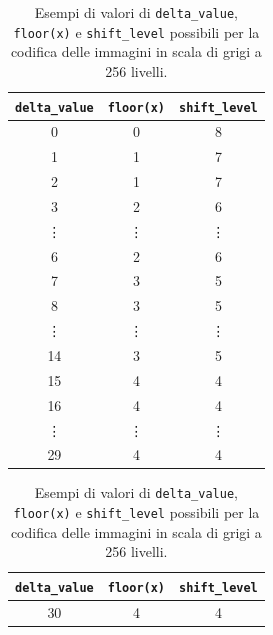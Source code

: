 \documentclass{article}
\begin{document}
\begin{itemize}
            \vspace{0,2cm}
            \begin{table}[h]
                \centering
                \small
                \def\arraystretch{1.3} %
                \caption{Esempi di valori di \texttt{delta\_value}, \texttt{floor(x)} e \texttt{shift\_level} possibili per la codifica delle immagini in scala di grigi a 256 livelli.}
                \begin{tabular}{||c|c|c||}
                    \hline
                    \texttt{delta\_value} & \texttt{floor(x)\footnotemark} & \texttt{shift\_level}\\
                    \hline \hline
                    0       & 0         & 8         \\\hline
                    1       & 1         & 7         \\\hline
                    2       & 1         & 7         \\\hline
                    3       & 2         & 6         \\\hline
                    \vdots  & \vdots    & \vdots    \\\hline
                    6       & 2         & 6         \\\hline
                    7       & 3         & 5         \\\hline
                    8       & 3         & 5         \\\hline
                    \vdots  & \vdots    & \vdots    \\\hline
                    14      & 3         & 5         \\\hline
                    15      & 4         & 4         \\\hline
                    16      & 4         & 4         \\\hline
                    \vdots  & \vdots    & \vdots    \\\hline
                    29      & 4         & 4         \\\hline
                \end{tabular}\hspace{20pt}
                \begin{tabular}{||c|c|c||}
                    \hline
                    \texttt{delta\_value} & \texttt{floor(x)\footnotemark[\value{footnote}]} & \texttt{shift\_level}\\
                    \hline \hline
                    30      & 4         & 4         \\\hline

\end{tabular}
\end{table}
\end{itemize}
\end{document}
